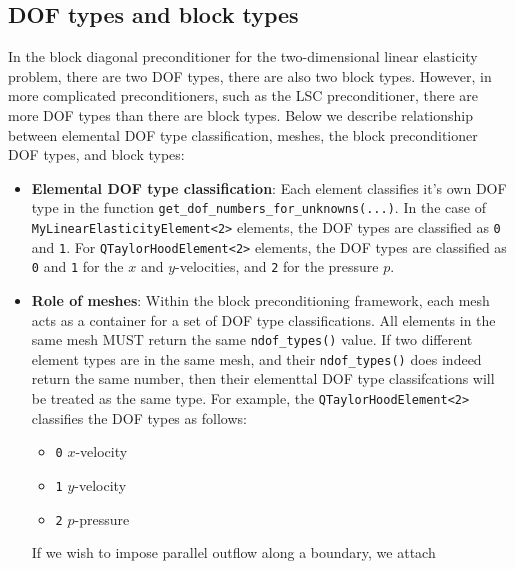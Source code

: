 \subsection{DOF types and block types\label{sec:dof_types_and_block_types}}
In the block diagonal preconditioner for the two-dimensional linear elasticity problem, there are two DOF types, there are also two block types. However, in more complicated preconditioners, such as the LSC preconditioner, there are more DOF types than there are block types. Below we describe relationship between elemental DOF type classification, meshes, the block preconditioner DOF types, and block types:
\begin{itemize}
\item \textbf{Elemental DOF type classification}: Each element classifies it's own DOF type in the function \verb+get_dof_numbers_for_unknowns(...)+. In the case of \verb+MyLinearElasticityElement<2>+ elements, the DOF types are classified as \verb+0+ and \verb+1+. For \verb+QTaylorHoodElement<2>+ elements, the DOF types are classified as \verb+0+ and \verb+1+ for the $x$ and $y$-velocities, and \verb+2+ for the pressure $p$. 

\item \textbf{Role of meshes}: Within the block preconditioning framework, each mesh acts as a container for a set of DOF type classifications. All elements in the same mesh MUST return the same \verb+ndof_types()+ value. If two different element types are in the same mesh, and their \verb+ndof_types()+ does indeed return the same number, then their elementtal DOF type classifcations will be treated as the same type. For example, the \verb+QTaylorHoodElement<2>+ classifies the DOF types as follows:
\begin{itemize}
 \item \verb+0+ $x$-velocity
 \item \verb+1+ $y$-velocity
 \item \verb+2+ $p$-pressure
\end{itemize}
If we wish to impose parallel outflow along a boundary, we attach 


\end{itemize}
